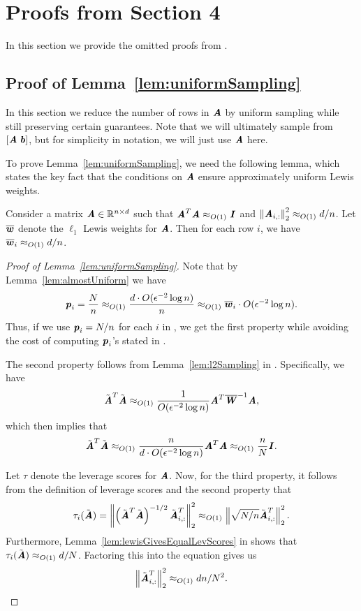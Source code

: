 \section{Proofs from Section 4}\label{sec:sec4proofs}

In this section we provide the omitted proofs from . 
\subsection{Proof of Lemma~\ref{lem:uniformSampling}}
\label{subsec:unifSample}

In this section we reduce the number of rows in $\AA$ by uniform sampling while still preserving certain guarantees. Note that we will ultimately sample from $[\AA\;\bb]$, but for simplicity in notation, we will just use $\AA$ here.


To prove Lemma~\ref{lem:uniformSampling}, we need the following lemma, which states the key fact that the conditions on $\AA$ ensure approximately uniform Lewis weights.

\begin{lemma}\label{lem:almostUniform}
	Consider a matrix $\AA \in \R^{n \times d}$ such that $\AA^T\AA \approx_{O(1)} \II$ and $\norme{\AA_{i,:}}^2 \approx_{O(1)} d/n$.
	Let $\lw$ denote the $\ell_1$ Lewis weights for $\AA$.
	Then for each row $i$, we have $\lw_i \approx_{O(1)} d/n$.
\end{lemma}

\begin{proof}[Proof of Lemma~\ref{lem:uniformSampling}]
	Note that by Lemma~\ref{lem:almostUniform} we have 
	\[
	\pp_i = \frac{N}{n} \approx_{O(1)} \frac{d \cdot O(\epsilon^{-2}\log{n})}{n}  \approx_{O(1)} \lw_i \cdot O(\epsilon^{-2}\log{n}).
	\]
	Thus, if we use $\pp_i = N/n$ for each $i$ in , we get the first property while avoiding the cost of computing $\pp_i$'s stated in .
	
The second property follows from Lemma~\ref{lem:l2Sampling} in . Specifically, we have 
\[
\tilde{\AA}^T\tilde{\AA} \approx_{O(1)} \frac{1}{O(\epsilon^{-2}\log{n})}\AA^T\LW^{-1}\AA,
\]
which then implies that
\[
\tilde{\AA}^T\tilde{\AA} \approx_{O(1)} \frac{n}{d \cdot O(\epsilon^{-2}\log{n})}\AA^T\AA \approx_{O(1)} \frac{n}{N} \II.
\]

Let $\tau$ denote the leverage scores for $\AA$.
Now, for the third property, it follows from the definition of leverage scores and the second property that
\[
\tau_i(\tilde{\AA}) = \norme{\left(\tilde{\AA}^T\tilde{\AA}\right)^{-1/2}\tilde{\AA}_{i,:}^T}^2 \approx_{O(1)} \norme{\sqrt{N/n}\tilde{\AA}_{i,:}^T}^2.
\]
Furthermore, Lemma~\ref{lem:lewisGivesEqualLevScores} in  shows that $\tau_i(\tilde{\AA}) \approx_{O(1)} d/N$.
Factoring this into the equation gives us
\[ 
\norme{\tilde{\AA}_{i,:}^T}^2 \approx_{O(1)} dn/N^2. 
\]
\end{proof}

